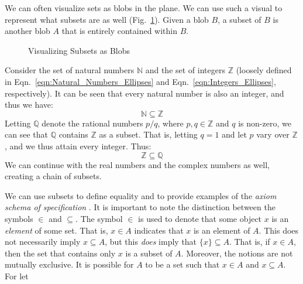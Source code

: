         We can often visualize sets as blobs in the plane. We can use such a
        visual to represent what subsets are as well
        (Fig.~\ref{fig:Subset_Blobs}). Given a blob $B$, a subset of $B$ is
        another blob $A$ that is entirely contained within $B$.
        \begin{figure}[H]
            \centering
            
            \caption{Visualizing Subsets as Blobs}
            \label{fig:Subset_Blobs}
        \end{figure}
        \begin{example}
            Consider the set of natural numbers $\mathbb{N}$ and the set of
            integers $\mathbb{Z}$ (loosely defined in
            Eqn.~\ref{eqn:Natural_Numbers_Ellipses} and
            Eqn.~\ref{eqn:Integers_Ellipses}, respectively). It can be seen that
            every natural number is also an integer, and thus we have:
            \begin{equation}
                \mathbb{N}\subseteq\mathbb{Z}
            \end{equation}
            Letting $\mathbb{Q}$ denote the rational numbers $p/q$, where
            $p,q\in\mathbb{Z}$ and $q$ is non-zero, we can see that $\mathbb{Q}$
            contains $\mathbb{Z}$ as a subset. That is, letting $q=1$ and let
            $p$ vary over $\mathbb{Z}$, and we thus attain every integer. Thus:
            \begin{equation}
                \mathbb{Z}\subseteq\mathbb{Q}
            \end{equation}
            We can continue with the real numbers and the complex numbers as
            well, creating a chain of subsets.
        \end{example}
        We can use subsets to define equality and to provide examples
        of the \textit{axiom schema of specification}%
        . It is important to note the
        distinction between the symbols $\in$ and $\subseteq$. The symbol $\in$
        is used to denote that some object $x$ is an \textit{element}%
         of some set. That is, $x\in{A}$ indicates that
        $x$ is an element of $A$. This does not necessarily imply
        $x\subseteq{A}$, but this \textit{does} imply that $\{x\}\subseteq{A}$.
        That is, if $x\in{A}$, then the set that contains only $x$ is a subset
        of $A$. Moreover, the notions are not mutually exclusive. It is possible
        for $A$ to be a set such that $x\in{A}$ and $x\subseteq{A}$. For let
